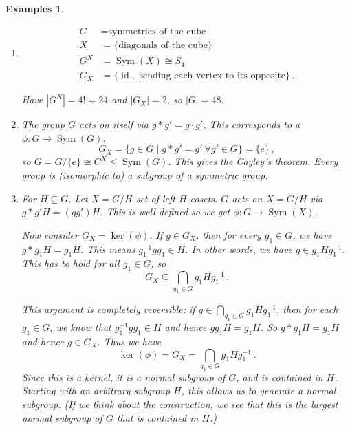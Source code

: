 \documentclass{article}
\theoremstyle{plain}\theoremheaderfont{\normalfont\itshape}\theorembodyfont{\rmfamily}\theoremseparator{.}\newtheorem*{rem}{Remark}\newtheorem*{ex}{Example}\newtheorem*{proof}{Proof}\newtheorem*{altp}{Alternative proof}\newtheorem*{nonex}{Non-Example}
\theoremstyle{plain}\theoremheaderfont{\normalfont\bfseries}\theorembodyfont{\rmfamily}\theoremseparator{.}\newtheorem{thm}{Theorem}[section]\newtheorem{lem}[thm]{Lemma}\newtheorem{prop}[thm]{Proposition}\newtheorem*{cor}{Corollary}\newtheorem{defn}[thm]{Definition}\newtheorem{clm}[thm]{Claim}\newtheorem{clminproof}{Claim}\newtheorem*{notn}{Notation}\newtheorem*{exer}{Exercise}\newtheorem*{lemnn}{Lemma}
\theoremstyle{break}\theoremheaderfont{\normalfont\itshape}\theorembodyfont{\rmfamily}\theoremseparator{.\medskip}\newtheorem*{proofskip}{Proof}\newtheorem*{exs}{Examples}\newtheorem*{rems}{Remarks}\newtheorem*{obs}{Observations}
\theoremstyle{break}\theoremheaderfont{\normalfont\bfseries}\theorembodyfont{\rmfamily}\theoremseparator{.\medskip}\newtheorem{lemskip}[thm]{Lemma}\newtheorem{defnskip}[thm]{Definition}\newtheorem{propskip}[thm]{Proposition}\newtheorem{thmskip}[thm]{Theorem}
\numberwithin{equation}{section}
\newcommand{\abs}[1]{\left|#1\right|}
\DeclareMathOperator*{\Sym}{Sym}
\DeclareMathOperator*{\id}{id}
\begin{document}
    \begin{exs}
        \begin{enumerate}[topsep=0pt,label=(\roman*)]
            \item
            \begin{align*}
                G&=\text{symmetries of the cube}\\
                X&=\{\text{diagonals of the cube}\}\\
                G^X&=\Sym(X)\cong S_4\\
                G_X&=\{\id,\text{ sending each vertex to its opposite}\}\,.
            \end{align*}
            \begin{figure}[ht!]
                \centering
            \end{figure}
            Have \(\abs{G^X}=4!=24\) and \(\abs{G_X}=2\), so \(\abs{G}=48\).
            \item The group \(G\) acts on itself via \(g*g'=g\cdot g'\). This corresponds to a \(\phi:G\to\Sym(G)\).
            \[G_X=\{g\in G\mid g*g'=g'\ \forall g'\in G\}=\{e\}\,,\]
            so \(G=G/\{e\}\cong C^X\le\Sym(G)\). This gives the Cayley's theorem. Every group is (isomorphic to) a subgroup of a symmetric group.
            \item For \(H\subseteq G\). Let \(X=G/H\) set of left \(H\)-cosets. \(G\) acts on \(X=G/H\) via \(g*g'H=(gg')H\). This is well defined so we get \(\phi:G\to\Sym(X)\).
            
            Now consider \(G_X=\ker(\phi)\). If \(g\in G_X\), then for every \(g_1\in G\), we have \(g*g_1H=g_1H\). This means \(g_1^{-1}gg_1\in H\). In other words, we have \(g\in g_1Hg_1^{-1}\). This has to hold for all \(g_1\in G\), so
            \[G_X\subseteq\bigcap_{g_1\in G}g_1Hg_1^{-1}\,.\]

            This argument is completely reversible: if \(g\in\bigcap_{g_1\in G}g_1Hg_1^{-1}\), then for each \(g_1\in G\), we know that \(g_1^{-1}gg_1\in H\) and hence \(gg_1H=g_1H\). So \(g*g_1H=g_1H\) and hence \(g\in G_X\). Thus we have
            \[\ker(\phi)=G_X=\bigcap_{g_1\in G}g_1Hg_1^{-1}\,.\]
            Since this is a kernel, it is a normal subgroup of \(G\), and is contained in \(H\). Starting with an arbitrary subgroup \(H\), this allows us to generate a normal subgroup. (If we think about the construction, we see that this is the largest normal subgroup of \(G\) that is contained in \(H\).)
        \end{enumerate}
    \end{exs}
\end{document}
